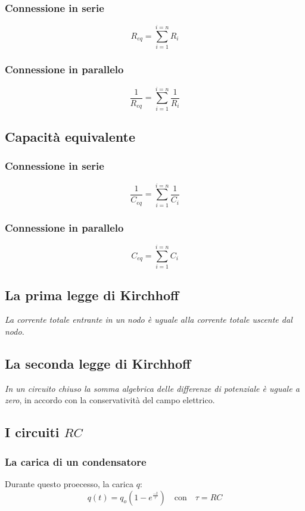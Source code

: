 \documentclass[12pt]{article}
\begin{document}
\subsubsection{Connessione in serie}
$$ R_{eq} = \sum_{i=1}^{i=n} R_i $$

\subsubsection{Connessione in parallelo}
$$ \frac{1}{R_{eq}} = \sum_{i=1}^{i=n} \frac{1}{R_i} $$

\subsection{Capacità equivalente}
\subsubsection{Connessione in serie}
$$ \frac{1}{C_{eq}} = \sum_{i=1}^{i=n} \frac{1}{C_i} $$

\subsubsection{Connessione in parallelo}
$$ C_{eq} = \sum_{i=1}^{i=n} C_i $$

\subsection{La prima legge di Kirchhoff}
\textit{La corrente totale entrante in un nodo è uguale alla corrente totale uscente dal nodo.}

\subsection{La seconda legge di Kirchhoff}
\textit{In un circuito chiuso la somma algebrica delle differenze di potenziale è uguale a zero}, in accordo con la conservatività del campo elettrico.

\subsection{I circuiti $RC$}
\subsubsection{La carica di un condensatore}
Durante questo proecesso, la carica $q$:
$$ q(t) = q_o(1-e^{\frac{-t}{\tau}}) \hspace{1em} \text{con} \hspace{1em} \tau = RC $$
\end{document}
